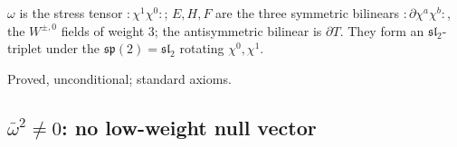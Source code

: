 \begin{physics}
$\omega$ is the stress tensor ${:}\chi^1\chi^0{:}$; $E,H,F$ are the three symmetric bilinears
${:}\partial\chi^a\chi^b{:}$, the $W^{\pm,0}$ fields of weight $3$; the antisymmetric bilinear is $\partial T$. They
form an $\mathfrak{sl}_2$-triplet under the $\mathfrak{sp}(2)=\mathfrak{sl}_2$ rotating $\chi^0,\chi^1$.
\end{physics}
\begin{status}
Proved, unconditional; standard axioms.
\end{status}

\subsection{\texorpdfstring{$\bar\omega^2\neq0$}{omega squared is nonzero}: no low-weight null vector}

